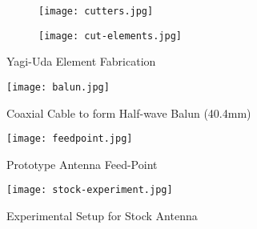 \documentclass[10pt,twocolumn,hidelinks]{witseiepaper}
\begin{document}

{\small
    
}
\newpage
\onecolumn
\appendix
\pagestyle{empty}


\begin{figure}[hbt!]
    \centering
    \begin{subfigure}{0.40\linewidth}
        \texttt{[image: cutters.jpg]}
    \end{subfigure}
    \begin{subfigure}{0.40\linewidth}
        \texttt{[image: cut-elements.jpg]}
    \end{subfigure}
    \caption{Yagi-Uda Element Fabrication}
    \label{fig:cutelem}
\end{figure}

\begin{figure}[h!]
    \begin{minipage}[c]{0.5\linewidth}
        \centering
        \texttt{[image: balun.jpg]}
        \caption{Coaxial Cable to form Half-wave Balun (40.4mm)}
        \label{fig:coaxbalun}
    \end{minipage}\hfill
    \begin{minipage}[c]{0.5\linewidth}
        \centering
        \texttt{[image: feedpoint.jpg]}
        \caption{Prototype Antenna Feed-Point}
        \label{fig:feedpoint}
    \end{minipage}

\end{figure}

\begin{figure*}[h!]
    \centering
    \texttt{[image: stock-experiment.jpg]}
    \caption{Experimental Setup for Stock Antenna}
    \label{fig:stockset}
\end{figure*}
\end{document}
